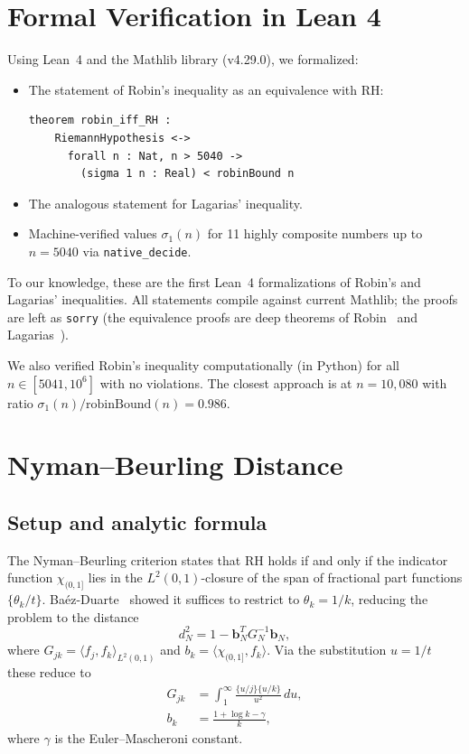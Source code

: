 \documentclass[11pt]{article}
\begin{document}
\section{Formal Verification in Lean 4}

Using Lean~4 and the Mathlib library (v4.29.0), we formalized:

\begin{itemize}
\item The statement of Robin's inequality as an equivalence with RH:
\begin{verbatim}
theorem robin_iff_RH :
    RiemannHypothesis <->
      forall n : Nat, n > 5040 ->
        (sigma 1 n : Real) < robinBound n
\end{verbatim}
\item The analogous statement for Lagarias' inequality.
\item Machine-verified values $\sigma_1(n)$ for 11 highly composite numbers
up to $n = 5040$ via \texttt{native\_decide}.
\end{itemize}

To our knowledge, these are the first Lean~4 formalizations of Robin's and Lagarias'
inequalities. All statements compile against current Mathlib; the proofs are left as
\texttt{sorry} (the equivalence proofs are deep theorems of Robin~\cite{robin1984}
and Lagarias~\cite{lagarias2002}).

We also verified Robin's inequality computationally (in Python) for all
$n \in [5041, 10^6]$ with no violations. The closest approach is at
$n = 10{,}080$ with ratio $\sigma_1(n)/\mathrm{robinBound}(n) = 0.986$.

\section{Nyman--Beurling Distance}

\subsection{Setup and analytic formula}

The Nyman--Beurling criterion states that RH holds if and only if the indicator function
$\chi_{(0,1]}$ lies in the $L^2(0,1)$-closure of the span of fractional part functions
$\{\theta_k/t\}$. Ba\'ez-Duarte~\cite{baezduarte2003} showed it suffices to restrict to
$\theta_k = 1/k$, reducing the problem to the distance
\[
  d_N^2 = 1 - \mathbf{b}_N^T G_N^{-1} \mathbf{b}_N,
\]
where $G_{jk} = \langle f_j, f_k \rangle_{L^2(0,1)}$ and $b_k = \langle \chi_{(0,1]}, f_k \rangle$.
Via the substitution $u = 1/t$ these reduce to
\begin{align}
  G_{jk} &= \int_1^\infty \tfrac{\{u/j\}\{u/k\}}{u^2}\,du, \label{eq:Gjk}\\
  b_k &= \frac{1 + \log k - \gamma}{k}, \label{eq:bk}
\end{align}
where $\gamma$ is the Euler--Mascheroni constant.
\end{document}
